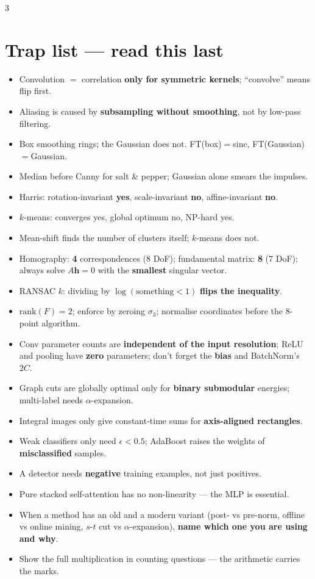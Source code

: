 \documentclass[9pt,a4paper,landscape]{extarticle}
\newcommand{\key}[1]{\textbf{#1}}
\begin{document}
\begin{multicols}{3}
\section{Trap list --- read this last}
\begin{itemize}
\item Convolution $=$ correlation \key{only for symmetric kernels}; ``convolve'' means flip first.
\item Aliasing is caused by \key{subsampling without smoothing}, not by low-pass filtering.
\item Box smoothing rings; the Gaussian does not. FT(box)$=$sinc, FT(Gaussian)$=$Gaussian.
\item Median before Canny for salt \& pepper; Gaussian alone smears the impulses.
\item Harris: rotation-invariant \key{yes}, scale-invariant \key{no}, affine-invariant \key{no}.
\item $k$-means: converges yes, global optimum no, NP-hard yes.
\item Mean-shift finds the number of clusters itself; $k$-means does not.
\item Homography: \key{4} correspondences (8 DoF); fundamental matrix: \key{8} (7 DoF); always solve $A\mathbf h=0$ with the \key{smallest} singular vector.
\item RANSAC $k$: dividing by $\log(\text{something}<1)$ \key{flips the inequality}.
\item $\mathrm{rank}(F)=2$; enforce by zeroing $\sigma_3$; normalise coordinates before the 8-point algorithm.
\item Conv parameter counts are \key{independent of the input resolution}; ReLU and pooling have \key{zero} parameters; don't forget the \key{bias} and BatchNorm's $2C$.
\item Graph cuts are globally optimal only for \key{binary submodular} energies; multi-label needs $\alpha$-expansion.
\item Integral images only give constant-time sums for \key{axis-aligned rectangles}.
\item Weak classifiers only need $\epsilon<0.5$; AdaBoost raises the weights of \key{misclassified} samples.
\item A detector needs \key{negative} training examples, not just positives.
\item Pure stacked self-attention has no non-linearity --- the MLP is essential.
\item When a method has an old and a modern variant (post- vs pre-norm, offline vs online mining, $s$-$t$ cut vs $\alpha$-expansion), \key{name which one you are using and why}.
\item Show the full multiplication in counting questions --- the arithmetic carries the marks.
\end{itemize}

\end{multicols}
\end{document}
